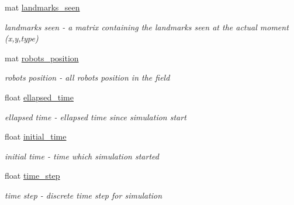 \begin{DoxyCompactItemize}
mat \hyperlink{class_robot_navigation_ab40654dfb4a3593172da4b285734cdf5}{landmarks\+\_\+seen}
\begin{DoxyCompactList}\small\item\em landmarks seen -\/ a matrix containing the landmarks seen at the actual moment (x,y,type) \end{DoxyCompactList}\item 
\mbox{\label{class_robot_navigation_a75aaeeea363d928d6dc8c6de90824d3f}} 
mat \hyperlink{class_robot_navigation_a75aaeeea363d928d6dc8c6de90824d3f}{robots\+\_\+position}
\begin{DoxyCompactList}\small\item\em robots position -\/ all robots position in the field \end{DoxyCompactList}\item 
\mbox{\label{class_robot_navigation_a4ccd950c2d302318d4635263096bc977}} 
float \hyperlink{class_robot_navigation_a4ccd950c2d302318d4635263096bc977}{ellapsed\+\_\+time}
\begin{DoxyCompactList}\small\item\em ellapsed time -\/ ellapsed time since simulation start \end{DoxyCompactList}\item 
\mbox{\label{class_robot_navigation_a0aefa2162f9e8911625c977b134cd333}} 
float \hyperlink{class_robot_navigation_a0aefa2162f9e8911625c977b134cd333}{initial\+\_\+time}
\begin{DoxyCompactList}\small\item\em initial time -\/ time which simulation started \end{DoxyCompactList}\item 
\mbox{\label{class_robot_navigation_a1f1de08123eaff99571bb21fa411d4dd}} 
float \hyperlink{class_robot_navigation_a1f1de08123eaff99571bb21fa411d4dd}{time\+\_\+step}
\begin{DoxyCompactList}\small\item\em time step -\/ discrete time step for simulation \end{DoxyCompactList}\item 
\mbox{\label{class_robot_navigation_ad7ff88f46b33d23be62fc365b650361e}} 

\end{DoxyCompactItemize}
